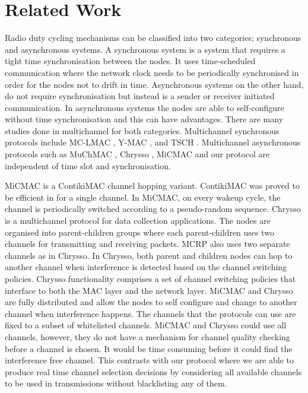 \section{Related Work}
\label{sec:relatedwork}
Radio duty cycling mechanisms can be classified into two categories; synchronous and asynchronous systems. A synchronous system is a system that requires a tight time synchronisation between the nodes. It uses time-scheduled communication where the network clock needs to be periodically synchronised in order for the nodes not to drift in time. Asynchronous systems on the other hand, do not require synchronisation but instead is a sender or receiver initiated communication. In asynchronous systems the nodes are able to self-configure without time synchronisation and this can have advantages. There are many studies done in multichannel for both categories. Multichannel synchronous protocols include MC-LMAC \cite{mc-lmac}, Y-MAC \cite{y-mac}, and TSCH \cite{tsch}. Multichannel asynchronous protocols such as MuChMAC \cite{muchmac}, Chrysso \cite{chrysso}, MiCMAC \cite{micmac} and our protocol are independent of time slot and synchronisation.  

MiCMAC \cite{micmac} is a ContikiMAC \cite{contikimac} channel hopping variant. ContikiMAC was proved to be efficient in \cite{micmac,orpl} for a single channel. In MiCMAC, on every wakeup cycle, the channel is periodically switched according to a pseudo-random sequence. Chrysso \cite{chrysso} is a multichannel protocol for data collection applications. The nodes are organised into parent-children groups where each parent-children uses two channels for transmitting and receiving packets. MCRP also uses two separate channels as in Chrysso. In Chrysso, both parent and children nodes can hop to another channel when interference is detected based on the channel switching policies. Chrysso functionality comprises a set of channel switching policies that interface to both the MAC layer and the network layer. 
MiCMAC and Chrysso are fully distributed and allow the nodes to self configure and change to another channel when interference happens. The channels that the protocols can use are fixed to a subset of whitelisted channels. MiCMAC and Chrysso could use all channels, however, they do not have a mechanism for channel quality checking before a channel is chosen. It would be time consuming before it could find the interference free channel. This contrasts with our protocol where we are able to produce real time channel selection decisions by considering all available channels to be used in transmissions without blacklisting any of them. 

